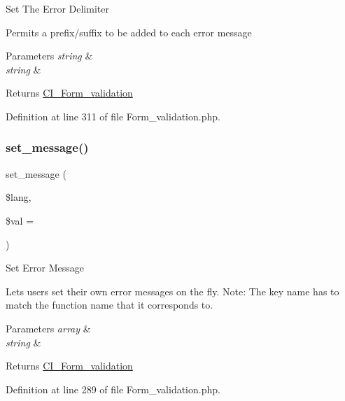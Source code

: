 Set The Error Delimiter

Permits a prefix/suffix to be added to each error message


\begin{DoxyParams}{Parameters}
{\em string} & \\
\hline
{\em string} & \\
\hline
\end{DoxyParams}
\begin{DoxyReturn}{Returns}
\mbox{\hyperlink{class_c_i___form__validation}{C\+I\+\_\+\+Form\+\_\+validation}} 
\end{DoxyReturn}


Definition at line 311 of file Form\+\_\+validation.\+php.

\mbox{\label{class_c_i___form__validation_a5a0dc4d3aef1f228155320a1d5275895}} 
\subsubsection{\texorpdfstring{set\_message()}{set\_message()}}
{\footnotesize\ttfamily set\+\_\+message (\begin{DoxyParamCaption}\item[{}]{\$lang,  }\item[{}]{\$val = {\ttfamily \textquotesingle{}\textquotesingle{}} }\end{DoxyParamCaption})}

Set Error Message

Lets users set their own error messages on the fly. Note\+: The key name has to match the function name that it corresponds to.


\begin{DoxyParams}{Parameters}
{\em array} & \\
\hline
{\em string} & \\
\hline
\end{DoxyParams}
\begin{DoxyReturn}{Returns}
\mbox{\hyperlink{class_c_i___form__validation}{C\+I\+\_\+\+Form\+\_\+validation}} 
\end{DoxyReturn}


Definition at line 289 of file Form\+\_\+validation.\+php.

\mbox{\label{class_c_i___form__validation_a9e66e3cdc5ceb81c054d48e1203613f2}} 
